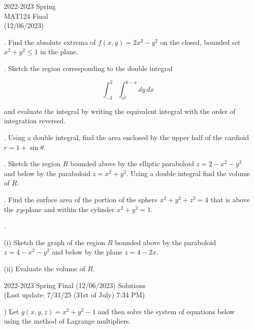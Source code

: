 \documentclass{article}
\begin{document}
\pagestyle{empty}
\large

\begin{center}
2022-2023 Spring \\MAT124 Final\\(12/06/2023)
\end{center}

. Find the absolute extrema of $f(x,y) = 2x^2-y^2$ on the closed, bounded set $x^2+y^2\leq1$ in the plane.

\hfill

. Sketch the region corresponding to the double integral

\begin{equation*}\int_{-3}^2\int_{x^2}^{6-x}dy\,dx\end{equation*}

\hfill

\noindent and evaluate the integral by writing the equivalent integral with the order of integration reversed.

\hfill

. Using a double integral, find the area enclosed by the upper half of the cardioid $r=1+\sin\theta$.

\hfill

. Sketch the region $R$ bounded above by the elliptic paraboloid $z=2-x^2-y^2$ and below by the paraboloid $z=x^2+y^2$. Using a double integral find the volume of $R$.

\hfill

. Find the surface area of the portion of the sphere $x^2+y^2+z^2=4$ that is above the $xy$-plane and within the cylinder $x^2+y^2=1$.

\hfill

.

\hfill

\noindent (i) Sketch the graph of the region $R$ bounded above by the paraboloid $z=4-x^2-y^2$ and below by the plane $z=4-2x$.

\hfill

\noindent (ii) Evaluate the volume of $R$.

\newpage

\begin{center}
2022-2023 Spring Final (12/06/2023) Solutions\\
(Last update: 7/31/25 (31st of July) 7:34 PM)
\end{center}

) Let $g(x,y,z)=x^2+y^2-1$ and then solve the system of equations below using the method of Lagrange multipliers.
\end{document}
